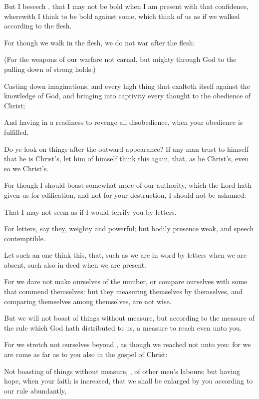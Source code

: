 {But I
beseech
{}, that I
may
not be
bold when I am
present with that
confidence, wherewith I
think to be
bold
against
some,
which
think of
us as
if we
walked according
to the
flesh.

For though we
walk
in the
flesh, we
do
not
war
after the
flesh:

(For the
weapons of
our
warfare
{}
not
carnal,
but
mighty through
God
to the pulling
down of strong
holds;)

Casting
down
imaginations,
and
every high
thing that exalteth
itself
against the
knowledge of
God,
and bringing into
captivity
every
thought
to the
obedience of
Christ;

And
having
in a
readiness to
revenge
all
disobedience,
when
your
obedience is
fulfilled.

Do ye
look on
things
after the outward
appearance?
If any
man
trust to
himself that he
is
Christ’s, let
him
of
himself
think
this
again,
that,
as
he
{}
Christ’s,
even
so
{}
we
Christ’s.

For
though I should
boast
somewhat
more
of
our
authority,
which the
Lord hath
given
us
for
edification,
and
not
for
your
destruction, I
should
not be
ashamed:

That I
may
not
seem
as
if I would
terrify
you
by
letters.

For
{}
letters, say
they,
{}
weighty
and
powerful;
but
{}
bodily
presence
{}
weak,
and
{}
speech
contemptible.

Let such an
one
think
this,
that, such
as we
are in
word
by
letters when we are
absent,
such
{}
also in
deed when we are
present.

For we
dare
not make ourselves of the
number,
or
compare
ourselves with
some that
commend
themselves:
but
they
measuring
themselves
by
themselves,
and
comparing
themselves among
themselves,
are
not
wise.

But
we
will
not
boast
of
things
without
{}
measure,
but according
to the
measure of the
rule
which
God hath
distributed to
us, a
measure to
reach
even
unto
you.

For we
stretch
not
ourselves
beyond
{}, as
though we
reached
not
unto
you:
for we are
come as far
as to
you
also
in
{} the
gospel of
Christ:

Not
boasting
of
things
without
{}
measure,
{},
of other
men’s
labours;
but
having
hope, when
your
faith is
increased, that we shall be
enlarged
by
you
according
to
our
rule
abundantly,

}
